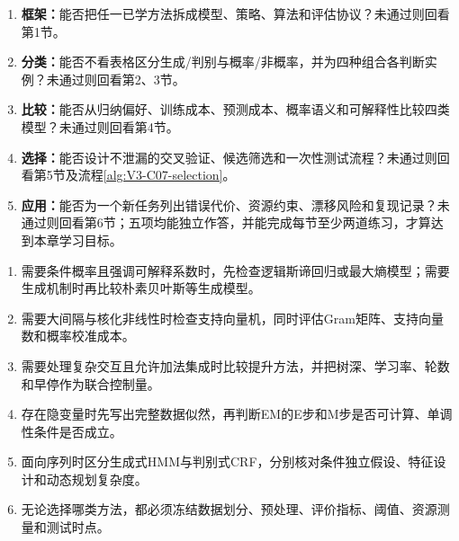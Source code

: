 \begin{SLCompactClosure}
\label{struct:V3-C07-CH36}

\label{struct:V3-C07-CH37}
\begin{selfcheckbox}
\begin{enumerate}[leftmargin=2.2em]
  \item \textbf{框架：}能否把任一已学方法拆成模型、策略、算法和评估协议？未通过则回看第1节。
  \item \textbf{分类：}能否不看表格区分生成/判别与概率/非概率，并为四种组合各判断实例？未通过则回看第2、3节。
  \item \textbf{比较：}能否从归纳偏好、训练成本、预测成本、概率语义和可解释性比较四类模型？未通过则回看第4节。
  \item \textbf{选择：}能否设计不泄漏的交叉验证、候选筛选和一次性测试流程？未通过则回看第5节及流程\ref{alg:V3-C07-selection}。
  \item \textbf{应用：}能否为一个新任务列出错误代价、资源约束、漂移风险和复现记录？未通过则回看第6节；五项均能独立作答，并能完成每节至少两道练习，才算达到本章学习目标。
\end{enumerate}
\end{selfcheckbox}

\begin{keypointbox}[title=全册方法选择速查]
\begin{enumerate}[leftmargin=2.2em,nosep]
  \item 需要条件概率且强调可解释系数时，先检查逻辑斯谛回归或最大熵模型；需要生成机制时再比较朴素贝叶斯等生成模型。
  \item 需要大间隔与核化非线性时检查支持向量机，同时评估Gram矩阵、支持向量数和概率校准成本。
  \item 需要处理复杂交互且允许加法集成时比较提升方法，并把树深、学习率、轮数和早停作为联合控制量。
  \item 存在隐变量时先写出完整数据似然，再判断EM的E步和M步是否可计算、单调性条件是否成立。
  \item 面向序列时区分生成式HMM与判别式CRF，分别核对条件独立假设、特征设计和动态规划复杂度。
  \item 无论选择哪类方法，都必须冻结数据划分、预处理、评价指标、阈值、资源测量和测试时点。
\end{enumerate}
\end{keypointbox}


\end{SLCompactClosure}
